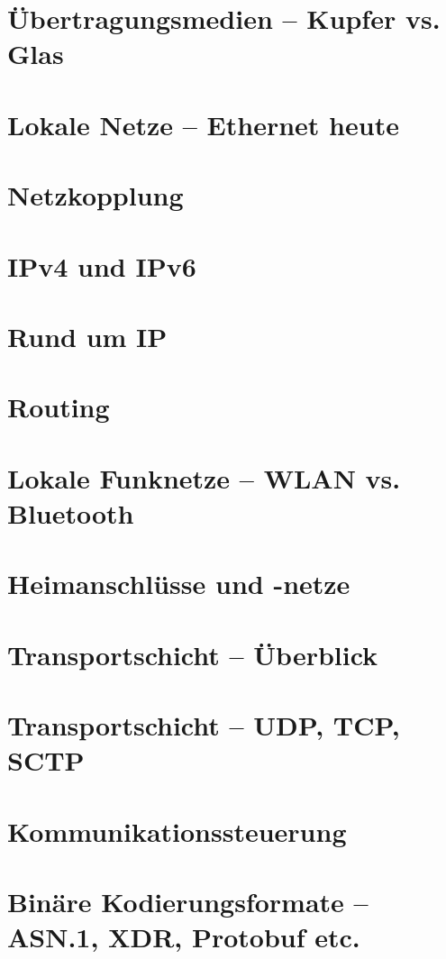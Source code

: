 \documentclass[hidelinks]{article}
\begin{document}
\section{Übertragungsmedien -- Kupfer vs. Glas}

\section{Lokale Netze -- Ethernet heute}

\section{Netzkopplung}

\section{IPv4 und IPv6}

\section{Rund um IP}

\section{Routing}

\section{Lokale Funknetze -- WLAN vs. Bluetooth}

\section{Heimanschlüsse und -netze}

\section{Transportschicht -- Überblick}

\section{Transportschicht -- UDP, TCP, SCTP}

\section{Kommunikationssteuerung}

\section{Binäre Kodierungsformate -- ASN.1, XDR, Protobuf etc.}
\end{document}
